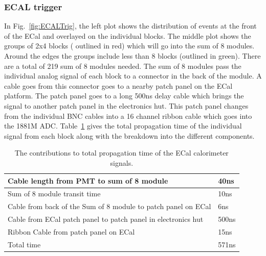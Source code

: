 \documentclass[]{article}
\begin{document}
 \subsubsection{ECAL trigger}
 \label{sec:ecal-trig}
 In Fig.~\ref{fig:ECALTrig}, the left plot shows the distribution of events at the front of the ECal
 and overlayed on the individual blocks. The middle plot shows the groups of 2x4 blocks ( outlined in red)
 which will go into the sum of 8 modules. Around the edges the groups include less than 8 blocks 
 (outlined in green). There are a total of 219 sum of 8 modules needed.
 The sum of 8 modules pass the individual analog signal of each block to a connector in the
 back of the module. A cable goes from this connector goes to a nearby patch panel on the ECal platform. The patch panel goes to a long 500ns delay cable which brings the signal to
 another patch panel in the electronics hut. This patch panel changes from the individual BNC cables into a 16 channel ribbon cable which goes into the 1881M ADC. 
 Table~\ref{tab:ECALadctime} gives the total propagation time of the individual signal from each block along with the breakdown into the different components.
 \begin{table}[b]
 	\begin{tabular}{|l|l|} \hline
 		Cable length from PMT to sum of 8 module & 40ns \\ \hline
 		Sum of 8 module transit time & 10ns \\ \hline
 		Cable from back of the Sum of 8 module to patch panel on ECal & 6ns \\ \hline
 		Cable from ECal patch panel to patch panel in electronics hut & 500ns \\ \hline
 		Ribbon Cable from patch panel on ECal & 15ns \\ \hline
 		  		Total time & 571ns \\ \hline  		   		  		 		 
 	\end{tabular}
 	\caption{The contributions to total propagation time  of the ECal calorimeter signals.}
 	\label{tab:ECALadctime}
 \end{table}
 
 
 
\end{document}
